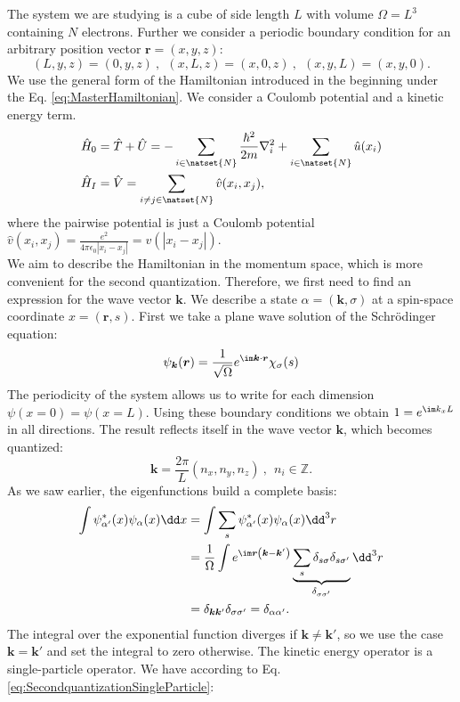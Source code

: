 \documentclass[../main.tex]{subfile}
\begin{document}
The system we are studying is a cube of side length $L$ with volume $\Omega = L^3$ containing $N$ electrons. Further we consider a periodic boundary condition for an arbitrary 
position vector $\bm{r} = (x,y,z)$:
\[
    (L,y,z) = (0,y,z)~,~~(x,L,z) = (x,0,z)~,~~(x,y,L) = (x,y,0).
\]  
We use the general form of the Hamiltonian introduced in the beginning under the Eq. \ref{eq:MasterHamiltonian}. We consider a Coulomb potential and a kinetic energy term.
\begin{align}
    \hat{H}_0 &= \hat{T}+\hat{U} =- \sum_{i\in \natset{N}} \frac{\hbar^2}{2m}\nabla_i^2 + \sum_{i\in \natset{N}} \hat{u}(x_i)\\
    \hat{H}_I &= \hat{V}= \sum_{i\neq j \in \natset{N}} \hat{v}(x_i, x_j),
\end{align} 
where the pairwise potential is just a Coulomb potential $\hat{v}(x_i, x_j) = \frac{e^2}{4\pi\epsilon_0|x_i - x_j|} = v(|x_i - x_j|)$.\\
We aim to describe the Hamiltonian in the momentum space, which is more convenient for the second quantization. Therefore, we first
need to find an expression for the wave vector $\bm{k}$. We describe a state $\alpha = (\bm{k}, \sigma)$ at a spin-space coordinate $x = (\bm{r}, s)$.
 First we take a plane wave solution of the Schrödinger equation:
\[
    \psi_{\bm{k}}(\bm{r}) = \frac{1}{\sqrt{\Omega}} e^{\im \bm{k}\cdot\bm{r}} \chi_\sigma(s)
\]
The periodicity of the system allows us to write for each dimension $\psi(x=0) = \psi(x=L)$. Using these boundary conditions we obtain 
$1= e^{\im k_x L}$ in all directions. The result reflects itself in the wave vector $\bm{k}$, which becomes quantized:
\[
    \bm{k} = \frac{2\pi}{L}(n_x, n_y, n_z)~,~~n_i\in \mathbb{Z}.
\]
As we saw earlier, the eigenfunctions build a complete basis:
\begin{align*}
    \int \psi^{\ast}_{\alpha'}(x) \psi_{\alpha}(x) \dd x &= \int \sum_{s} \psi^{\ast}_{\alpha'}(x) \psi_{\alpha}(x) \dd^3r \\
    &=\frac{1}{\Omega} \int e^{\im\bm{r}\left(\bm{k}- \bm{k}'\right)} \underbrace{\sum_s \delta_{s\sigma}\delta_{s\sigma'}}_{\delta_{\sigma\sigma'}} \dd^3 r\\
    &= \delta_{\bm{k}\bm{k}'}\delta_{\sigma\sigma'} = \delta_{\alpha\alpha'}.
\end{align*}    
The integral over the exponential function diverges if $\bm{k} \neq \bm{k}'$, so we use the case $\bm{k} = \bm{k}'$ and set the integral to zero otherwise.
The kinetic energy operator is a single-particle operator. We have according to Eq. \ref{eq:SecondquantizationSingleParticle}:
\end{document}
